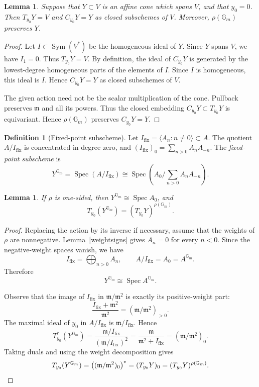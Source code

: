 \documentclass[12pt]{article}
\newtheorem{lemma}[theorem]{Lemma}
\theoremstyle{definition}
\newtheorem{definition}[theorem]{Definition}
\DeclareMathOperator{\Spec}{Spec}
\DeclareMathOperator{\Sym}{Sym}
\newcommand{\Gm}{\mathbb G_m}
\begin{document}
\begin{lemma}\label{tangentcone}
    Suppose that $Y\subset V$ is an affine cone which spans $V$, and that $y_0=0$. Then $T_{y_0}Y=V$ and $C_{y_0}Y=Y$ as closed subschemes of $V$. Moreover, $\rho(\Gm)$ preserves $Y$.
\end{lemma}
\begin{proof}
    Let $I\subset\Sym(V^*)$ be the homogeneous ideal of $Y$. Since $Y$ spans $V$, we have $I_1=0$. Thus $T_{y_0}Y=V$. By definition, the ideal of $C_{y_0}Y$ is generated by the lowest-degree homogeneous parts of the elements of $I$. Since $I$ is homogeneous, this ideal is $I$. Hence $C_{y_0}Y=Y$ as closed subschemes of $V$.

    The given action need not be the scalar multiplication of the cone. Pullback preserves $\mathfrak m$ and all its powers. Thus the closed embedding $C_{y_0}Y\subset T_{y_0}Y$ is equivariant. Hence $\rho(\Gm)$ preserves $C_{y_0}Y=Y$.
\end{proof}



\begin{definition}[Fixed-point subscheme]\label{fixedsubscheme}
    Let $I_{\mathrm{fix}}=\langle A_n:n\ne0\rangle\subset A$. The quotient $A/I_{\mathrm{fix}}$ is concentrated in degree zero, and $(I_{\mathrm{fix}})_0=\sum_{n>0}A_nA_{-n}$. The \emph{fixed-point subscheme} is
    \[
        Y^{\Gm}=\Spec(A/I_{\mathrm{fix}})
        \cong
        \Spec\left(A_0\Big/\sum_{n>0}A_nA_{-n}\right).
    \]
\end{definition}

\begin{lemma}\label{fixedpoints}
     If $\rho$ is one-sided, then $Y^{\Gm}\cong\Spec A_0$, and
     \[
        T_{y_0}(Y^{\Gm})=(T_{y_0}Y)^{\rho(\Gm)}.
    \]
\end{lemma}
\begin{proof}
    Replacing the action by its inverse if necessary, assume that the weights of $\rho$ are nonnegative. Lemma~\ref{weightsigns} gives $A_n=0$ for every $n<0$.
    Since the negative-weight spaces vanish, we have
    \[
        I_{\mathrm{fix}}=\bigoplus_{n>0}A_n,
        \qquad
        A/I_{\mathrm{fix}}=A_0=A^{\Gm}.
    \]
    Therefore
    \[
        Y^{\Gm}\cong\Spec A^{\Gm}.
    \]

    Observe that the image of $I_{\mathrm{fix}}$ in $\mathfrak m/\mathfrak m^2$ is exactly its positive-weight part:
    \[
        \frac{I_{\mathrm{fix}}+\mathfrak m^2}{\mathfrak m^2}
        =(\mathfrak m/\mathfrak m^2)_{>0}.
    \]
   The maximal ideal of $y_0$ in $A/I_{\mathrm{fix}}$ is $\mathfrak m/I_{\mathrm{fix}}$. Hence
    \[
        T^*_{y_0}(Y^{\Gm})=\frac{\mathfrak m/I_{\mathrm{fix}}}{(\mathfrak m/I_{\mathrm{fix}})^2}=\frac{\mathfrak m}{\mathfrak m^2+I_{\mathrm{fix}}}
        =(\mathfrak m/\mathfrak m^2)_0.
    \]
    Taking duals and using the weight decomposition gives
    \[
        T_{y_0}(Y^{\Gm})
        =\bigl((\mathfrak m/\mathfrak m^2)_0\bigr)^*
        =(T_{y_0}Y)_0
        =(T_{y_0}Y)^{\rho(\Gm)}.\qedhere
    \]
\end{proof}
\end{document}

